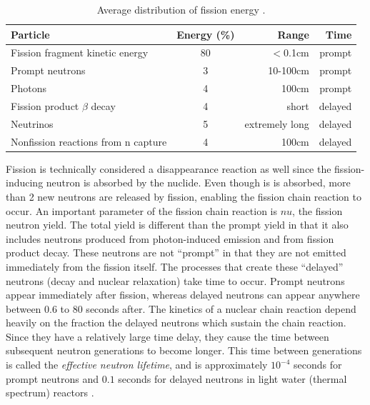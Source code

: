 \begin{table}[h]
\centering
\caption{Average distribution of fission energy \cite{duderstadt}.}
\label{fission_dist}
\begin{tabular}{| l | c | r | r |}
\hline
Particle & Energy (\%) & Range & Time \\
\hline
Fission fragment kinetic energy & 80 & $<$0.1cm & prompt \\
\hline
Prompt neutrons & 3 & 10-100cm & prompt \\
\hline
Photons & 4 & 100cm & prompt \\
\hline
Fission product $\beta$ decay & 4 & short & delayed \\
\hline
Neutrinos &  5 & extremely long & delayed \\
\hline
Nonfission reactions from n capture & 4 & 100cm & delayed \\
\hline
\end{tabular}
\end{table}

Fission is technically considered a disappearance reaction as well since the fission-inducing neutron is absorbed by the nuclide.  Even though is is absorbed, more than 2 new neutrons are released by fission, enabling the fission chain reaction to occur.  An important parameter of the fission chain reaction is $nu$, the fission neutron yield.    The total yield is different than the prompt yield in that it also includes neutrons produced from photon-induced emission and from fission product decay.  These neutrons are not ``prompt'' in that they are not emitted immediately from the fission itself.  The processes that create these ``delayed'' neutrons (decay and nuclear relaxation) take time to occur.  Prompt neutrons appear immediately after fission, whereas delayed neutrons can appear anywhere between 0.6 to 80 seconds after.  The kinetics of a nuclear chain reaction depend heavily on the fraction the delayed neutrons which sustain the chain reaction.  Since they have a relatively large time delay, they cause the time between subsequent neutron generations to become longer.  This time between generations is called the \emph{effective neutron lifetime}, and is approximately $10^{-4}$ seconds for prompt neutrons and $0.1$ seconds for delayed neutrons in light water (thermal spectrum) reactors \cite{duderstadt}.  

